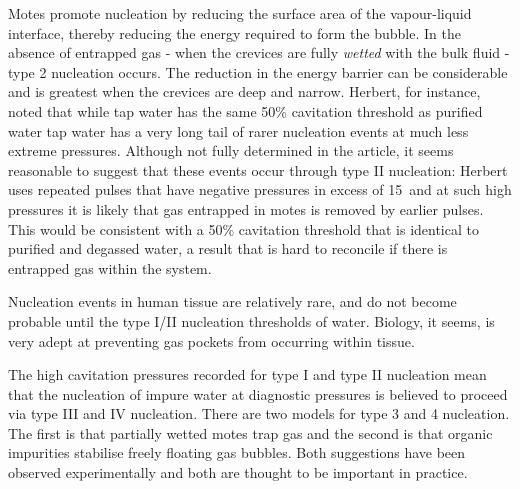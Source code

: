 Motes %
promote nucleation by reducing the surface area of the vapour-liquid interface,
thereby reducing the energy required to form the bubble.
In the absence of entrapped gas - when the crevices are fully {\em wetted} with the bulk fluid -  type 2 nucleation occurs.
The reduction in the energy barrier can be considerable and is greatest when the crevices are deep and narrow\cite{Lubetkin1995}.
Herbert\cite{Herbert2006}, for instance, noted that while tap water has the same 50\% cavitation threshold as purified water%
%
tap water has a very long tail of rarer nucleation events at much less extreme pressures.
Although not fully determined in the article, 
it seems reasonable to suggest that these events occur through type II nucleation:
Herbert uses repeated pulses that have negative pressures in excess of \unit{15}\mega\pascal\
and at such high pressures it is likely that gas entrapped in motes is removed 
by earlier pulses.
This would be consistent with a 50\% cavitation threshold that is identical to purified and degassed water,
a result that is hard to reconcile if there is entrapped gas within the system.

Nucleation events in human tissue are relatively rare,
%
and do not become probable until the type I/II nucleation thresholds of water\cite{}.
Biology, it seems, is very adept at preventing gas pockets from occurring within tissue.




The high cavitation pressures recorded for type I and type II nucleation 
mean that the nucleation of impure water at diagnostic pressures is believed to proceed via type III and IV nucleation\cite{Atchley1989, Borkent2009, Jones1999}.
There are two models for type 3 and 4 nucleation. 
The first is that  partially wetted motes trap gas\cite{Atchley1989} and  the second is 
that  organic impurities  stabilise freely floating gas bubbles\cite{Yount1979}.
Both suggestions have been observed experimentally\cite{Borkent2009, Johnson1981}
and both are thought to be important in practice.

